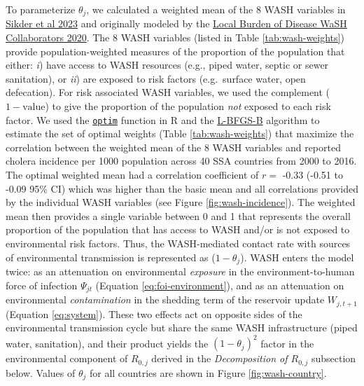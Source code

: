 \documentclass[
]{book}
\begin{document}
To parameterize \(\theta_j\), we calculated a weighted mean of the 8 WASH variables in \href{https://doi.org/10.1021/acs.est.3c01317}{Sikder et al 2023} and originally modeled by the \href{https://www.thelancet.com/journals/langlo/article/PIIS2214-109X(20)30278-3/fulltext}{Local Burden of Disease WaSH Collaborators 2020}. The 8 WASH variables (listed in Table \ref{tab:wash-weights}) provide population-weighted measures of the proportion of the population that either: \emph{i}) have access to WASH resources (e.g., piped water, septic or sewer sanitation), or \emph{ii}) are exposed to risk factors (e.g.~surface water, open defecation). For risk associated WASH variables, we used the complement (\(1-\text{value}\)) to give the proportion of the population \emph{not} exposed to each risk factor. We used the \href{https://www.rdocumentation.org/packages/stats/versions/3.6.2/topics/optim}{\texttt{optim}} function in R and the \href{https://en.wikipedia.org/wiki/Limited-memory_BFGS}{L-BFGS-B} algorithm to estimate the set of optimal weights (Table \ref{tab:wash-weights}) that maximize the correlation between the weighted mean of the 8 WASH variables and reported cholera incidence per 1000 population across 40 SSA countries from 2000 to 2016. The optimal weighted mean had a correlation coefficient of \(r =\) -0.33 (-0.51 to -0.09 95\% CI) which was higher than the basic mean and all correlations provided by the individual WASH variables (see Figure \ref{fig:wash-incidence}). The weighted mean then provides a single variable between 0 and 1 that represents the overall proportion of the population that has access to WASH and/or is not exposed to environmental risk factors. Thus, the WASH-mediated contact rate with sources of environmental transmission is represented as (\(1-\theta_j\)). WASH enters the model twice: as an attenuation on environmental \emph{exposure} in the environment-to-human force of infection \(\Psi_{jt}\) (Equation \eqref{eq:foi-environment}), and as an attenuation on environmental \emph{contamination} in the shedding term of the reservoir update \(W_{j,t+1}\) (Equation \eqref{eq:system}). These two effects act on opposite sides of the environmental transmission cycle but share the same WASH infrastructure (piped water, sanitation), and their product yields the \((1-\theta_j)^2\) factor in the environmental component of \(R_{0,j}\) derived in the \emph{Decomposition of \(R_{0,j}\)} subsection below. Values of \(\theta_j\) for all countries are shown in Figure \ref{fig:wash-country}.
\end{document}
